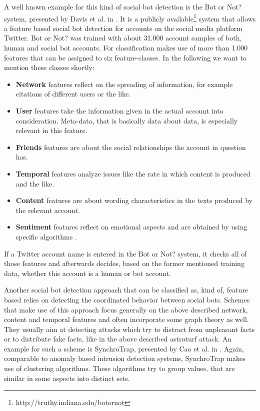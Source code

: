 A well known example for this kind of social bot detection is the Bot or Not? system, presented by Davis et al. in \cite{botornot}. It is a publicly available\footnote{http://truthy.indiana.edu/botornot} system that allows a feature based social bot detection for accounts on the social media platform Twitter. Bot or Not? was trained with about 31.000 account samples of both, human and social bot accounts. For classification makes use of more than 1.000 features that can be assigned to six feature-classes. In the following we want to mention these classes shortly:
\begin{itemize}
	\item \textbf{Network} features reflect on the spreading of information, for example citations of different users or the like.
	\item \textbf{User} features take the information given in the actual account into consideration. Meta-data, that is basically data about data, is especially relevant in this feature. 
	\item \textbf{Friends} features are about the social relationships the account in question has.
	\item \textbf{Temporal} features analyze issues like the rate in which content is produced and the like.
	\item \textbf{Content} features are about wording characteristics in the texts produced by the relevant account.
	\item \textbf{Sentiment} features reflect on emotional aspects and are obtained by using specific algorithms \cite{botornot}.
\end{itemize}  
If a Twitter account name is entered in the Bot or Not? system, it checks all of those features and afterwards decides, based on the former mentioned training data, whether this account is a human or bot account.

Another social bot detection approach that can be classified as, kind of, feature based relies on detecting the coordinated behavior between social bots. Schemes that make use of this approach focus generally on the above described network, content and temporal features and often incorporate some graph theory as well. They usually aim at detecting attacks which try to distract from unpleasant facts or to distribute fake facts, like in the above described astroturf attack.  An example for such a scheme is SynchroTrap, presented by Cao et al. in \cite{synchrotrap}. Again, comparable to anomaly based intrusion detection systems, SynchroTrap makes use of clustering algorithms. These algorithms try to group values, that are similar in some aspects into distinct sets. 

